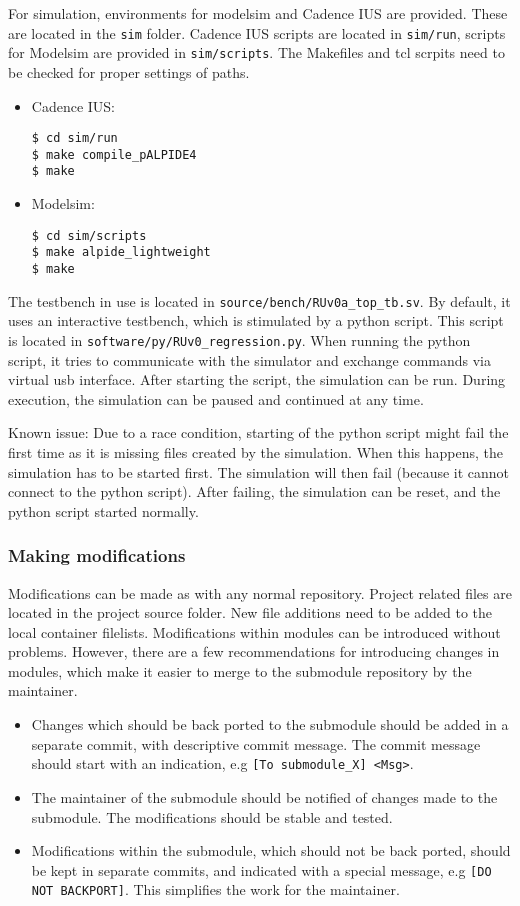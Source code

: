 \documentclass{scrartcl}
\begin{document}
For simulation, environments for modelsim and Cadence IUS are
provided. These are located in the \verb|sim| folder. Cadence IUS
scripts are located in \verb|sim/run|, scripts for Modelsim are
provided in \verb|sim/scripts|. The Makefiles and tcl scrpits need to
be checked for proper settings of paths.
\begin{itemize}
\item Cadence IUS:
\begin{verbatim}
$ cd sim/run
$ make compile_pALPIDE4
$ make
\end{verbatim}
\item Modelsim:
\begin{verbatim}
$ cd sim/scripts
$ make alpide_lightweight
$ make
\end{verbatim}
\end{itemize}

The testbench in use is located in
\verb|source/bench/RUv0a_top_tb.sv|. By default, it uses an
interactive testbench, which is stimulated by a python script. This
script is located in \verb|software/py/RUv0_regression.py|. When
running the python script, it tries to communicate with the simulator
and exchange commands via virtual usb interface. After starting the
script, the simulation can be run. During execution, the simulation
can be paused and continued at any time.

Known issue: Due to a race condition, starting of the python script
might fail the first time as it is missing files created by the
simulation. When this happens, the simulation has to be started
first. The simulation will then fail (because it cannot connect to the
python script). After failing, the simulation can be reset, and the
python script started normally.

\subsubsection{Making modifications}

Modifications can be made as with any normal repository. Project
related files are located in the project source folder. New file
additions need to be added to the local container
filelists. Modifications within modules can be introduced without
problems. However, there are a few recommendations for introducing
changes in modules, which make it easier to merge to the submodule
repository by the maintainer.

\begin{itemize}
\item Changes which should be back ported to the submodule should be
  added in a separate commit, with descriptive commit message. The
  commit message should start with an indication, e.g
  \verb|[To submodule_X] <Msg>|.
\item The maintainer of the submodule should be notified of changes
  made to the submodule. The modifications should be stable and
  tested.
\item Modifications within the submodule, which should not be
  back ported, should be kept in separate commits, and indicated with a
  special message, e.g \verb|[DO NOT BACKPORT]|. This simplifies the
  work for the maintainer.
\end{itemize}
\end{document}
